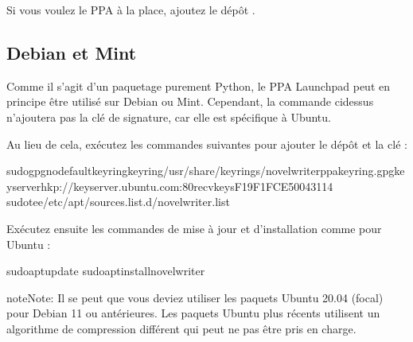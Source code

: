 \documentclass[a4paper,11pt,french]{sphinxmanual}
\begin{document}
\sphinxAtStartPar
Si vous voulez le PPA  à la place, ajoutez le dépôt .


\subsection{Debian et Mint}
\label{\detokenize{int_started:debian-and-mint}}
\sphinxAtStartPar
Comme il s’agit d’un paquetage purement Python, le PPA Launchpad peut en principe être utilisé sur Debian ou Mint. Cependant, la commande ci\sphinxhyphen{}dessus n’ajoutera pas la clé de signature, car elle est spécifique à Ubuntu.

\sphinxAtStartPar
Au lieu de cela, exécutez les commandes suivantes pour ajouter le dépôt et la clé :

\begin{sphinxVerbatim}[commandchars=\\\{\}]
sudogpg\PYGZhy{}\PYGZhy{}no\PYGZhy{}default\PYGZhy{}keyring\PYGZhy{}\PYGZhy{}keyring/usr/share/keyrings/novelwriter\PYGZhy{}ppa\PYGZhy{}keyring.gpg\PYGZhy{}\PYGZhy{}keyserverhkp://keyserver.ubuntu.com:80\PYGZhy{}\PYGZhy{}recv\PYGZhy{}keysF19F1FCE50043114
sudotee/etc/apt/sources.list.d/novelwriter.list
\end{sphinxVerbatim}

\sphinxAtStartPar
Exécutez ensuite les commandes de mise à jour et d’installation comme pour Ubuntu :

\begin{sphinxVerbatim}[commandchars=\\\{\}]
sudoaptupdate
sudoaptinstallnovelwriter
\end{sphinxVerbatim}

\begin{sphinxadmonition}{note}{Note:}
\sphinxAtStartPar
Il se peut que vous deviez utiliser les paquets Ubuntu 20.04 (focal) pour Debian 11 ou antérieures. Les paquets Ubuntu plus récents utilisent un algorithme de compression différent qui peut ne pas être pris en charge.
\end{sphinxadmonition}
\end{document}
